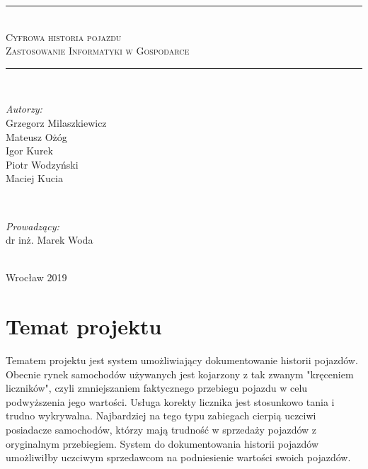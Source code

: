 \documentclass[12pt]{article}
\begin{document}
\begin{titlepage}
\newcommand{\LINE}{\rule{\linewidth}{0.7mm}}
\center
\LINE \\[0.5cm]
\Huge\textsc{Cyfrowa historia pojazdu}\\ [5mm]
\normalsize\textsc{Zastosowanie Informatyki w Gospodarce}  \\[0.5cm]
\LINE \\[3cm]
\begin{minipage}{0.5\textwidth}
\begin{flushleft} \large
\emph{Autorzy:}
		\\Grzegorz Milaszkiewicz %
		\\Mateusz Ożóg %
		\\Igor Kurek
		\\Piotr Wodzyński
		\\Maciej Kucia 
\end{flushleft}
\end{minipage}
~
\begin{minipage}{0.45\textwidth}
\begin{flushright} \large
\emph{Prowadzący:} \\
dr inż. Marek Woda
\end{flushright}
\end{minipage}\\[2cm]
\vfill
\center Wrocław 2019
\end{titlepage}

\renewcommand{\contentsname}{Spis treści}
\tableofcontents
\newpage

\section{Temat projektu}

Tematem projektu jest system umożliwiający dokumentowanie historii pojazdów. Obecnie rynek samochodów używanych jest kojarzony z tak zwanym "kręceniem liczników", czyli zmniejszaniem faktycznego przebiegu pojazdu w celu podwyższenia jego wartości. Usługa korekty licznika jest stosunkowo tania i trudno wykrywalna. Najbardziej na tego typu zabiegach cierpią uczciwi posiadacze samochodów, którzy mają trudność w sprzedaży pojazdów z oryginalnym przebiegiem. System do dokumentowania historii pojazdów umożliwiłby uczciwym sprzedawcom na podniesienie wartości swoich pojazdów. \\
\end{document}
